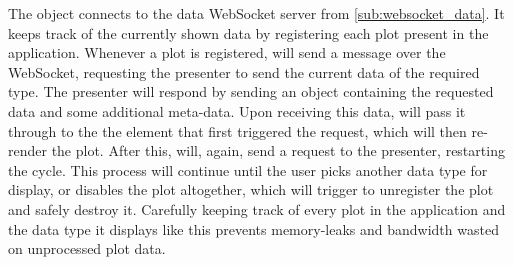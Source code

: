 \documentclass[a4paper, openany, oneside]{memoir}
\begin{document}
The  object connects to the data WebSocket server from \cref{sub:websocket_data}. It keeps track of the currently shown data by registering each plot present in the application. Whenever a plot is registered,  will send a message over the WebSocket, requesting the presenter to send the current data of the required type. The presenter will respond by sending an object containing the requested data and some additional meta-data. Upon receiving this data,  will pass it through to the the element that first triggered the request, which will then re-render the plot. After this,  will, again, send a request to the presenter, restarting the cycle. This process will continue until the user picks another data type for display, or disables the plot altogether, which will trigger  to unregister the plot and safely destroy it. Carefully keeping track of every plot in the application and the data type it displays like this prevents memory-leaks and bandwidth wasted on unprocessed plot data.
\end{document}
